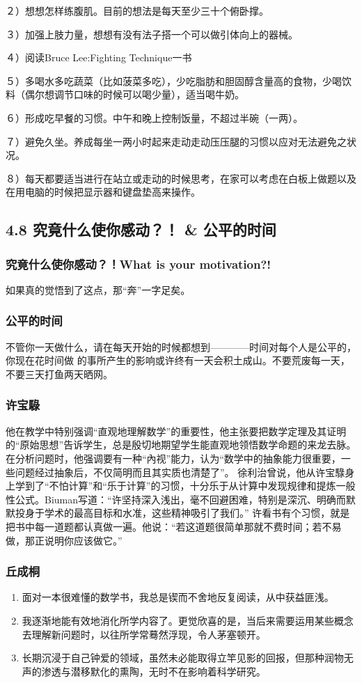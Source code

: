 \documentclass[11pt]{article}
\begin{document}
２）想想怎样练腹肌。目前的想法是每天至少三十个俯卧撑。

３）加强上肢力量，想想有没有法子搭一个可以做引体向上的器械。

４）阅读Bruce Lee:Fighting Technique一书

５）多喝水多吃蔬菜（比如菠菜多吃），少吃脂肪和胆固醇含量高的食物，少喝饮料（偶尔想调节口味的时候可以喝少量），适当喝牛奶。

６）形成吃早餐的习惯。中午和晚上控制饭量，不超过半碗（一两）。

７）避免久坐。养成每坐一两小时起来走动走动压压腿的习惯以应对无法避免之状况。

８）每天都要适当进行在站立或走动的时候思考，在家可以考虑在白板上做题以及在用电脑的时候把显示器和键盘垫高来操作。
\subsection*{4.8 究竟什么使你感动？！ \& 公平的时间}
\label{sec:orgheadline197}
\subsubsection*{究竟什么使你感动？！What is your motivation?!}
\label{sec:orgheadline193}
如果真的觉悟到了这点，那“奔”一字足矣。
\subsubsection*{公平的时间}
\label{sec:orgheadline194}
不管你一天做什么，请在每天开始的时候都想到————时间对每个人是公平的，你现在花时间做
的事所产生的影响或许终有一天会积土成山。不要荒废每一天，不要三天打鱼两天晒网。
\subsubsection*{许宝騄}
\label{sec:orgheadline195}
他在教学中特别强调“直观地理解数学”的重要性，他主张要把数学定理及其证明的“原始思想”告诉学生，总是殷切地期望学生能直观地领悟数学命题的来龙去脉。在分析问题时，他强调要有一种“內视”能力，认为“数学中的抽象能力很重要，一些问题经过抽象后，不仅简明而且其实质也清楚了”。
徐利治曾说，他从许宝騄身上学到了“不怕计算”和“乐于计算”的习惯，十分乐于从计算中发现规律和提炼一般性公式。Biuman写道：“许坚持深入浅出，毫不回避困难，特别是深沉、明确而默默投身于学术的最高目标和水准，这些精神吸引了我们。”
许看书有个习惯，就是把书中每一道题都认真做一遍。他说：“若这道题很简单那就不费时间；若不易做，那正说明你应该做它。”
\subsubsection*{丘成桐}
\label{sec:orgheadline196}
\begin{enumerate}
\item 面对一本很难懂的数学书，我总是锲而不舍地反复阅读，从中获益匪浅。
\item 我逐渐地能有效地消化所学内容了。更觉欣喜的是，当后来需要运用某些概念去理解新问题时，以往所学常蓦然浮现，令人茅塞顿开。
\item 长期沉浸于自己钟爱的领域，虽然未必能取得立竿见影的回报，但那种润物无声的渗透与潜移默化的熏陶，无时不在影响着科学研究。
\end{enumerate}
\end{document}
